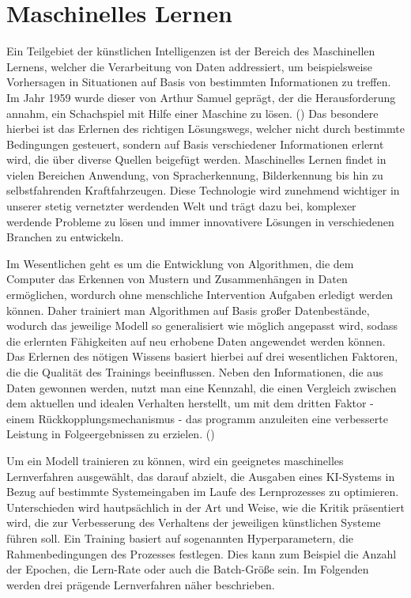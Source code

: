 \section{Maschinelles Lernen} \label{chpt:Stand_der_Technik_Maschinelles_Lernen}
Ein Teilgebiet der künstlichen Intelligenzen ist der Bereich des Maschinellen Lernens, welcher die Verarbeitung von Daten addressiert, um beispielsweise Vorhersagen in Situationen auf Basis von bestimmten Informationen zu treffen.
Im Jahr 1959 wurde dieser von Arthur Samuel geprägt, der die Herausforderung annahm, ein Schachspiel mit Hilfe einer Maschine zu lösen. (\cite[4]{joshi_machine_2020})
Das besondere hierbei ist das Erlernen des richtigen Lösungswegs, welcher nicht durch bestimmte Bedingungen gesteuert, sondern auf Basis verschiedener Informationen erlernt wird, die über diverse Quellen beigefügt werden.
Maschinelles Lernen findet in vielen Bereichen Anwendung, von Spracherkennung, Bilderkennung bis hin zu selbstfahrenden Kraftfahrzeugen. Diese Technologie wird zunehmend wichtiger in unserer stetig vernetzter werdenden Welt und trägt dazu bei, komplexer werdende Probleme zu lösen und immer innovativere Lösungen in verschiedenen Branchen zu entwickeln.

Im Wesentlichen geht es um die Entwicklung von Algorithmen, die dem Computer das Erkennen von Mustern und Zusammenhängen in Daten ermöglichen, wordurch ohne menschliche Intervention Aufgaben erledigt werden können.
Daher trainiert man Algorithmen auf Basis großer Datenbestände, wodurch das jeweilige Modell so generalisiert wie möglich angepasst wird, sodass die erlernten Fähigkeiten auf neu erhobene Daten angewendet werden können. Das Erlernen des nötigen Wissens basiert hierbei auf drei wesentlichen Faktoren, die die Qualität des Trainings beeinflussen. Neben den Informationen, die aus Daten gewonnen werden, nutzt man eine Kennzahl, die einen Vergleich zwischen dem aktuellen und idealen Verhalten herstellt, um mit dem dritten Faktor - einem Rückkopplungsmechanismus - das programm anzuleiten eine verbesserte Leistung in Folgeergebnissen zu erzielen. (\cite[4]{joshi_machine_2020})

Um ein Modell trainieren zu können, wird ein geeignetes maschinelles Lernverfahren ausgewählt, das darauf abzielt, die Ausgaben eines KI-Systems in Bezug auf bestimmte Systemeingaben im Laufe des Lernprozesses zu optimieren. Unterschieden wird hautpsächlich in der Art und Weise, wie die \glqq Kritik\grqq{} präsentiert wird, die zur Verbesserung des Verhaltens der jeweiligen künstlichen Systeme führen soll. Ein Training basiert auf sogenannten Hyperparametern, die Rahmenbedingungen des Prozesses festlegen. Dies kann zum Beispiel die Anzahl der Epochen, die Lern-Rate oder auch die Batch-Größe sein. Im Folgenden werden drei prägende Lernverfahren näher beschrieben.
